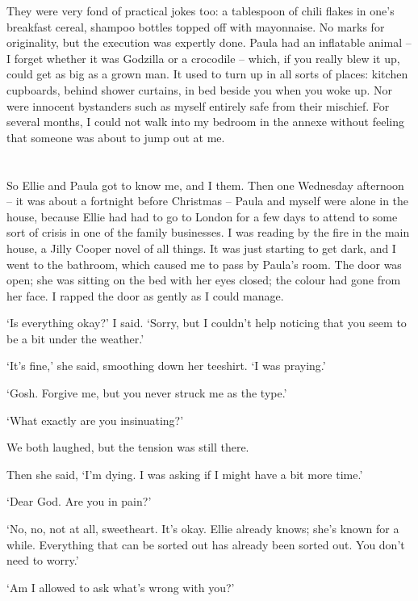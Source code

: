 They were very fond of practical jokes too: a tablespoon of chili flakes in one's breakfast cereal, shampoo bottles topped off with mayonnaise. No marks for originality, but the execution was expertly done. Paula had an inflatable animal -- I forget whether it was Godzilla or a crocodile -- which, if you really blew it up, could get as big as a grown man. It used to turn up in all sorts of places: kitchen cupboards, behind shower curtains, in bed beside you when you woke up. Nor were innocent bystanders such as myself entirely safe from their mischief. For several months, I could not walk into my bedroom in the annexe without feeling that someone was about to jump out at me.

\section{}

So Ellie and Paula got to know me, and I them. Then one Wednesday afternoon -- it was about a fortnight before Christmas -- Paula and myself were alone in the house, because Ellie had had to go to London for a few days to attend to some sort of crisis in one of the family businesses. I was reading by the fire in the main house, a Jilly Cooper novel of all things. It was just starting to get dark, and I went to the bathroom, which caused me to pass by Paula's room. The door was open; she was sitting on the bed with her eyes closed; the colour had gone from her face. I rapped the door as gently as I could manage.

`Is everything okay?' I said. `Sorry, but I couldn't help noticing that you seem to be a bit under the weather.'

`It's fine,' she said, smoothing down her teeshirt. `I was praying.'

`Gosh. Forgive me, but you never struck me as the type.'

`What exactly are you insinuating?'

We both laughed, but the tension was still there.

Then she said, `I'm dying. I was asking if I might have a bit more time.'

`Dear God. Are you in pain?'

`No, no, not at all, sweetheart. It's okay. Ellie already knows; she's known for a while. Everything that can be sorted out has already been sorted out. You don't need to worry.'

`Am I allowed to ask what's wrong with you?'

